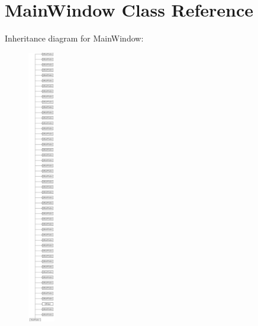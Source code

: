 \hypertarget{class_main_window}{}\section{Main\+Window Class Reference}
\label{class_main_window}
Inheritance diagram for Main\+Window\+:\begin{figure}[H]
\begin{center}
\leavevmode
\includegraphics[height=12.000000cm]{class_main_window}
\end{center}
\end{figure}
